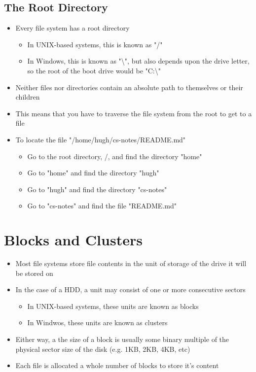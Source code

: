 \subsection*{The Root Directory}

\begin{itemize}
  \item Every file system has a root directory
  \begin{itemize}
    \item In UNIX-based systems, this is known as "/"
    \item In Windows, this is known as "\textbackslash", but also depends upon the drive letter, so the root of the boot drive would be "C:\textbackslash"
  \end{itemize}
  \item Neither files nor directories contain an absolute path to themselves or their children
  \item This means that you have to traverse the file system from the root to get to a file
  \item To locate the file "/home/hugh/cs-notes/README.md"
  \begin{itemize}
    \item Go to the root directory, /, and find the directory "home"
    \item Go to "home" and find the directory "hugh"
    \item Go to "hugh" and find the directory "cs-notes"
    \item Go to "cs-notes" and find the file "README.md"
  \end{itemize}
\end{itemize}

\section*{Blocks and Clusters}

\begin{itemize}
  \item Most file systems store file contents in the unit of storage of the drive it will be stored on
  \item In the case of a HDD, a unit may consist of one or more consecutive sectors
  \begin{itemize}
    \item In UNIX-based systems, these units are known as blocks
    \item In Windwos, these units are known as clusters
  \end{itemize}
  \item Either way, a the size of a block is usually some binary multiple of the physical sector size of the disk (e.g. 1KB, 2KB, 4KB, etc)
  \item Each file is allocated a whole number of blocks to store it's content
\end{itemize}

